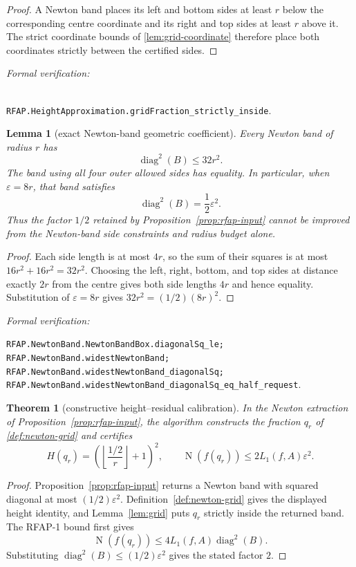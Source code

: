 \documentclass[11pt]{article}
\newtheorem{theorem}{Theorem}[section]
\newtheorem{lemma}[lemma]{Lemma}
\newcommand{\Norm}[1]{\operatorname{N}\!\left(#1\right)}
\newcommand{\diamq}{\operatorname{diag}^{2}}
\newcommand{\eps}{\varepsilon}
\newcommand{\leanref}[1]{\par\smallskip\noindent
  \emph{Formal verification:}\par\nobreak
  {\raggedright\nolinkurl{#1}.\par}}
\begin{document}
\begin{proof}
A Newton band places its left and bottom sides at least $r$ below the
corresponding centre coordinate and its right and top sides at least $r$
above it.  The strict coordinate bounds of \cref{lem:grid-coordinate}
therefore place both coordinates strictly between the certified sides.
\end{proof}

\leanref{
RFAP.HeightApproximation.gridFraction_strictly_inside}

\begin{lemma}[exact Newton-band geometric coefficient]
\label{lem:newton-band-half-sharp}
Every Newton band of radius $r$ has
\[
                         \diamq(B)\le32r^2.
\]
The band using all four outer allowed sides has equality.  In particular,
when $\eps=8r$, that band satisfies
\begin{equation}
\label{eq:newton-band-half-sharp}
                         \diamq(B)=\frac12\eps^2.
\end{equation}
Thus the factor $1/2$ retained by Proposition~\ref{prop:rfap-input} cannot be
improved from the Newton-band side constraints and radius budget alone.
\end{lemma}

\begin{proof}
Each side length is at most $4r$, so the sum of their squares is at most
$16r^2+16r^2=32r^2$.  Choosing the left, right, bottom, and top sides at
distance exactly $2r$ from the centre gives both side lengths $4r$ and hence
equality.  Substitution of $\eps=8r$ gives
$32r^2=(1/2)(8r)^2$.
\end{proof}

\leanref{RFAP.NewtonBand.NewtonBandBox.diagonalSq_le;
RFAP.NewtonBand.widestNewtonBand;
RFAP.NewtonBand.widestNewtonBand_diagonalSq;
RFAP.NewtonBand.widestNewtonBand_diagonalSq_eq_half_request}

\begin{theorem}[constructive height--residual calibration]
\label{thm:height-upper}
In the Newton extraction of Proposition~\ref{prop:rfap-input}, the algorithm
constructs the fraction $q_r$ of \cref{def:newton-grid} and certifies
\begin{equation}
\label{eq:height-upper}
 H(q_r)=\left(\left\lfloor\frac{1/2}{r}\right\rfloor+1\right)^2,
 \qquad
 \Norm{f(q_r)}\le2L_1(f,A)\eps^2.
\end{equation}
\end{theorem}

\begin{proof}
Proposition~\ref{prop:rfap-input} returns a Newton band with squared diagonal
at most $(1/2)\eps^2$.  Definition~\ref{def:newton-grid} gives the displayed
height identity, and Lemma~\ref{lem:grid} puts $q_r$ strictly inside the
returned band.  The RFAP-1 bound first gives
\[
                    \Norm{f(q_r)}
          \le4L_1(f,A)\diamq(B).
\]
Substituting $\diamq(B)\le(1/2)\eps^2$ gives the stated factor $2$.
\end{proof}
\end{document}
